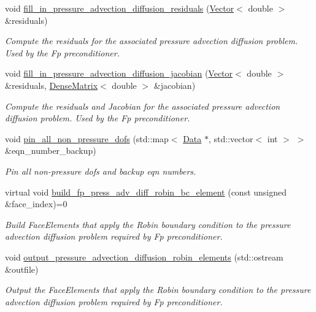 \begin{DoxyCompactItemize}
void \hyperlink{classoomph_1_1NavierStokesEquations_abea38bb5d8d50fc4b64ccdd5bcaf3c7c}{fill\+\_\+in\+\_\+pressure\+\_\+advection\+\_\+diffusion\+\_\+residuals} (\hyperlink{classoomph_1_1Vector}{Vector}$<$ double $>$ \&residuals)
\begin{DoxyCompactList}\small\item\em Compute the residuals for the associated pressure advection diffusion problem. Used by the Fp preconditioner. \end{DoxyCompactList}\item 
void \hyperlink{classoomph_1_1NavierStokesEquations_a43e4ca1dd5a520ca5df800c97cd92f8e}{fill\+\_\+in\+\_\+pressure\+\_\+advection\+\_\+diffusion\+\_\+jacobian} (\hyperlink{classoomph_1_1Vector}{Vector}$<$ double $>$ \&residuals, \hyperlink{classoomph_1_1DenseMatrix}{Dense\+Matrix}$<$ double $>$ \&jacobian)
\begin{DoxyCompactList}\small\item\em Compute the residuals and Jacobian for the associated pressure advection diffusion problem. Used by the Fp preconditioner. \end{DoxyCompactList}\item 
void \hyperlink{classoomph_1_1NavierStokesEquations_ae3a5de7bed7c884731e3bb2afc437758}{pin\+\_\+all\+\_\+non\+\_\+pressure\+\_\+dofs} (std\+::map$<$ \hyperlink{classoomph_1_1Data}{Data} $\ast$, std\+::vector$<$ int $>$ $>$ \&eqn\+\_\+number\+\_\+backup)
\begin{DoxyCompactList}\small\item\em Pin all non-\/pressure dofs and backup eqn numbers. \end{DoxyCompactList}\item 
virtual void \hyperlink{classoomph_1_1NavierStokesEquations_a16bfab3df70ad2204217590c0e3b7de1}{build\+\_\+fp\+\_\+press\+\_\+adv\+\_\+diff\+\_\+robin\+\_\+bc\+\_\+element} (const unsigned \&face\+\_\+index)=0
\begin{DoxyCompactList}\small\item\em Build Face\+Elements that apply the Robin boundary condition to the pressure advection diffusion problem required by Fp preconditioner. \end{DoxyCompactList}\item 
void \hyperlink{classoomph_1_1NavierStokesEquations_aaa8d3ae0aee457dc96e028583d793652}{output\+\_\+pressure\+\_\+advection\+\_\+diffusion\+\_\+robin\+\_\+elements} (std\+::ostream \&outfile)
\begin{DoxyCompactList}\small\item\em Output the Face\+Elements that apply the Robin boundary condition to the pressure advection diffusion problem required by Fp preconditioner. \end{DoxyCompactList}\item 

\end{DoxyCompactItemize}
